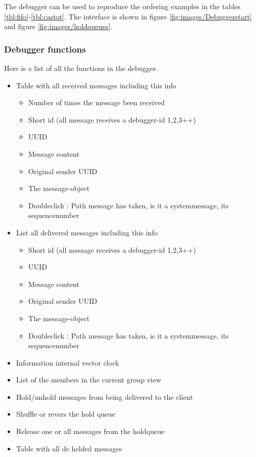 \documentclass[titlepage, twocolumn, a4paper, 10pt]{article}
\begin{document}
The debugger can be used to reproduce the ordering examples in the
tables \ref{tbl:fifo}-\ref{tbl:castot}. The interface is shown in
figure \vref{fig:images/Debuggerstart} and figure
\vref{fig:images/holdqueues}.

\subsubsection{Debugger functions}\label{sec:debuggerfunctions}
Here is a list of all the functions in the debugger.
\begin{itemize}
\item Table with all received messages including this info
  \begin{itemize}
  \item Number of times the message been received
  \item Short id (all message receives a debugger-id 1,2,3++)
  \item UUID
  \item Message content
  \item Original sender UUID
  \item The message-object
  \item Doubleclick : Path message has taken, is it a
    systemmessage, its sequencenumber
  \end{itemize}
\item List all delivered messages including this info
  \begin{itemize}
  \item Short id (all message receives a debugger-id 1,2,3++)
  \item UUID
  \item Message content
  \item Original sender UUID
  \item The message-object
  \item Doubleclick : Path message has taken, is it a
    systemmessage, its sequencenumber
  \end{itemize}
\item Information internal vector clock
\item List of the members in the current group view
\item Hold/unhold  messages from being delivered to the client
\item Shuffle or revers the hold queue
\item Release one or all messages from the holdqueue
\item Table with all de helded messages
  \begin{itemize}

\end{itemize}
\end{itemize}
\end{document}
